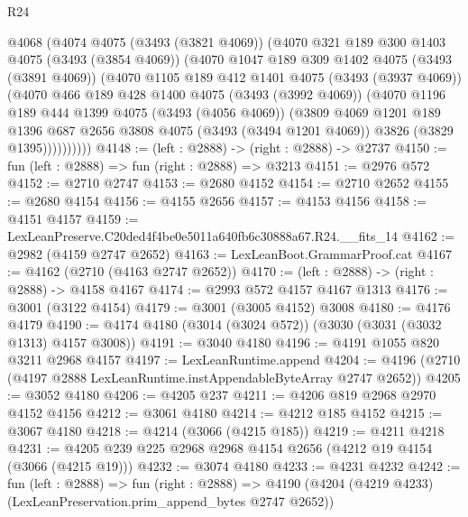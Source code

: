 \begin{lexlean}{R24}
\begin{coremodule}
      @4068
        (@4074
          @4075
          (@3493 (@3821 @4069))
          (@4070
            @321
            @189
            @300
            @1403
            @4075
            (@3493 (@3854 @4069))
            (@4070
              @1047
              @189
              @309
              @1402
              @4075
              (@3493 (@3891 @4069))
              (@4070
                @1105
                @189
                @412
                @1401
                @4075
                (@3493 (@3937 @4069))
                (@4070
                  @466
                  @189
                  @428
                  @1400
                  @4075
                  (@3493 (@3992 @4069))
                  (@4070
                    @1196
                    @189
                    @444
                    @1399
                    @4075
                    (@3493 (@4056 @4069))
                    (@3809
                      @4069
                      @1201
                      @189
                      @1396
                      @687
                      @2656
                      @3808
                      @4075
                      (@3493 (@3494 @1201 @4069))
                      @3826
                      (@3829 @1395))))))))))
@4148 := (left : @2888) -> (right : @2888) -> @2737
@4150 := fun (left : @2888) => fun (right : @2888) => @3213
@4151 := @2976 @572
@4152 := @2710 @2747
@4153 := @2680 @4152
@4154 := @2710 @2652
@4155 := @2680 @4154
@4156 := @4155 @2656
@4157 := @4153 @4156
@4158 := @4151 @4157
@4159 := LexLeanPreserve.C20ded4f4be0e5011a640fb6c30888a67.R24.__fits_14
@4162 := @2982 (@4159 @2747 @2652)
@4163 := LexLeanBoot.GrammarProof.cat
@4167 := @4162 (@2710 (@4163 @2747 @2652))
@4170 := (left : @2888) -> (right : @2888) -> @4158 @4167
@4174 := @2993 @572 @4157 @4167 @1313
@4176 := @3001 (@3122 @4154)
@4179 := @3001 (@3005 @4152) @3008
@4180 := @4176 @4179
@4190 := @4174 @4180 (@3014 (@3024 @572)) (@3030 (@3031 (@3032 @1313) @4157 @3008))
@4191 := @3040 @4180
@4196 := @4191 @1055 @820 @3211 @2968 @4157
@4197 := LexLeanRuntime.append
@4204 := @4196 (@2710 (@4197 @2888 LexLeanRuntime.instAppendableByteArray @2747 @2652))
@4205 := @3052 @4180
@4206 := @4205 @237
@4211 := @4206 @819 @2968 @2970 @4152 @4156
@4212 := @3061 @4180
@4214 := @4212 @185 @4152
@4215 := @3067 @4180
@4218 := @4214 (@3066 (@4215 @185))
@4219 := @4211 @4218
@4231 := @4205 @239 @225 @2968 @2968 @4154 @2656 (@4212 @19 @4154 (@3066 (@4215 @19)))
@4232 := @3074 @4180
@4233 := @4231 @4232
@4242 := fun (left : @2888) =>
  fun (right : @2888) =>
  @4190 (@4204 (@4219 @4233) (LexLeanPreservation.prim_append_bytes @2747 @2652))

\end{coremodule}
\end{lexlean}
